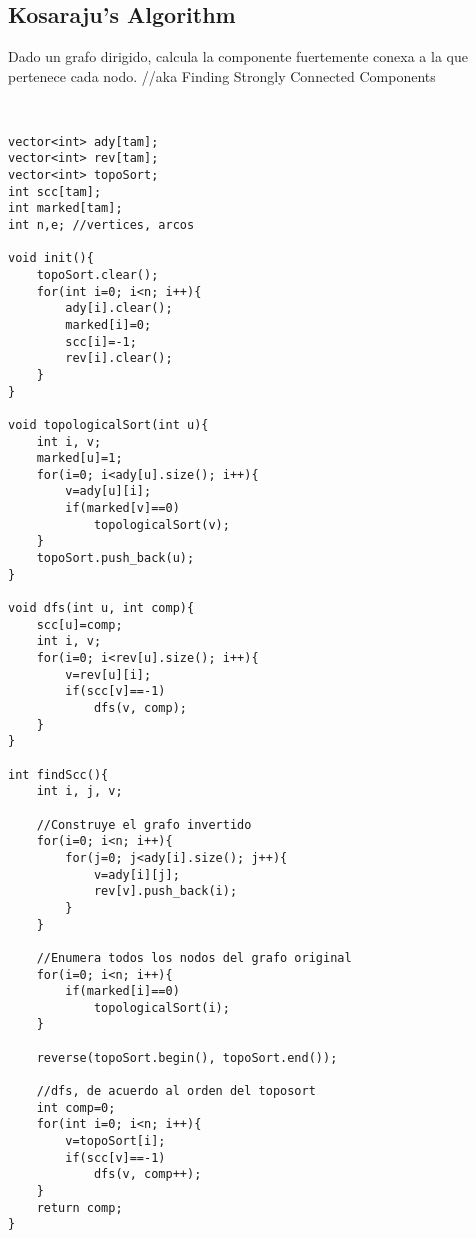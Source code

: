 \documentclass[11pt,letterpaper,twocolumn,twosided]{article}
\begin{document}
\subsection{Kosaraju's Algorithm}
Dado un grafo dirigido, calcula la componente fuertemente conexa a la que pertenece cada nodo.
//aka Finding Strongly Connected Components
\begin{lstlisting}


vector<int> ady[tam];
vector<int> rev[tam];
vector<int> topoSort;
int scc[tam];
int marked[tam];
int n,e; //vertices, arcos

void init(){
	topoSort.clear();
	for(int i=0; i<n; i++){
		ady[i].clear();
		marked[i]=0;
		scc[i]=-1;
		rev[i].clear();
	}
}

void topologicalSort(int u){
	int i, v;
	marked[u]=1;
	for(i=0; i<ady[u].size(); i++){
		v=ady[u][i];
		if(marked[v]==0)
			topologicalSort(v);
	}
	topoSort.push_back(u);
}

void dfs(int u, int comp){
	scc[u]=comp;
	int i, v;
	for(i=0; i<rev[u].size(); i++){
		v=rev[u][i];
		if(scc[v]==-1)
			dfs(v, comp);
	}
}

int findScc(){
	int i, j, v;
	
	//Construye el grafo invertido
	for(i=0; i<n; i++){
		for(j=0; j<ady[i].size(); j++){
			v=ady[i][j];
			rev[v].push_back(i);
		}
	}
	
	//Enumera todos los nodos del grafo original
	for(i=0; i<n; i++){
		if(marked[i]==0)
			topologicalSort(i);
	}

	reverse(topoSort.begin(), topoSort.end());
	
	//dfs, de acuerdo al orden del toposort
	int comp=0;
	for(int i=0; i<n; i++){
		v=topoSort[i];
		if(scc[v]==-1)
			dfs(v, comp++);
	}
	return comp;
}

\end{lstlisting}
\end{document}
